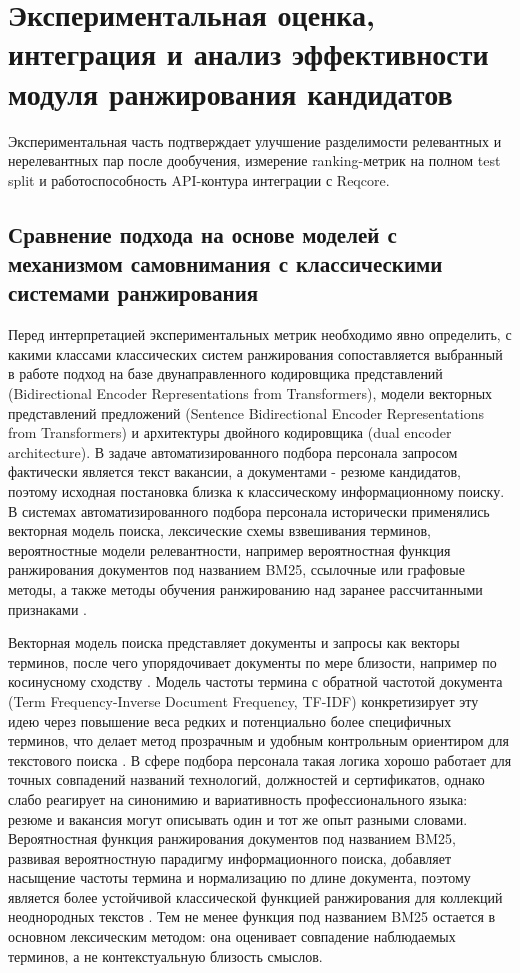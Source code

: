 \chapter{Экспериментальная оценка, интеграция и анализ эффективности модуля ранжирования кандидатов}
\label{chapter:eval}

Экспериментальная часть подтверждает улучшение разделимости релевантных и нерелевантных пар после дообучения, измерение ranking-метрик на полном test split и работоспособность API-контура интеграции с Reqcore.
\section{Сравнение подхода на основе моделей с механизмом самовнимания с классическими системами ранжирования}

Перед интерпретацией экспериментальных метрик необходимо явно определить, с какими классами классических систем ранжирования сопоставляется выбранный в работе подход на базе двунаправленного кодировщика представлений (Bidirectional Encoder Representations from Transformers), модели векторных представлений предложений (Sentence Bidirectional Encoder Representations from Transformers) и архитектуры двойного кодировщика (dual encoder architecture). В задаче автоматизированного подбора персонала запросом фактически является текст вакансии, а документами - резюме кандидатов, поэтому исходная постановка близка к классическому информационному поиску. В системах автоматизированного подбора персонала исторически применялись векторная модель поиска, лексические схемы взвешивания терминов, вероятностные модели релевантности, например вероятностная функция ранжирования документов под названием BM25, ссылочные или графовые методы, а также методы обучения ранжированию над заранее рассчитанными признаками \cite{src08, src11, src25}.

Векторная модель поиска представляет документы и запросы как векторы терминов, после чего упорядочивает документы по мере близости, например по косинусному сходству \cite{src25}. Модель частоты термина с обратной частотой документа (Term Frequency-Inverse Document Frequency, TF-IDF) конкретизирует эту идею через повышение веса редких и потенциально более специфичных терминов, что делает метод прозрачным и удобным контрольным ориентиром для текстового поиска \cite{src26}. В сфере подбора персонала такая логика хорошо работает для точных совпадений названий технологий, должностей и сертификатов, однако слабо реагирует на синонимию и вариативность профессионального языка: резюме и вакансия могут описывать один и тот же опыт разными словами. Вероятностная функция ранжирования документов под названием BM25, развивая вероятностную парадигму информационного поиска, добавляет насыщение частоты термина и нормализацию по длине документа, поэтому является более устойчивой классической функцией ранжирования для коллекций неоднородных текстов \cite{src11}. Тем не менее функция под названием BM25 остается в основном лексическим методом: она оценивает совпадение наблюдаемых терминов, а не контекстуальную близость смыслов.

